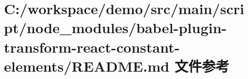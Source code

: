 \hypertarget{node__modules_2babel-plugin-transform-react-constant-elements_2_r_e_a_d_m_e_8md}{}\section{C\+:/workspace/demo/src/main/script/node\+\_\+modules/babel-\/plugin-\/transform-\/react-\/constant-\/elements/\+R\+E\+A\+D\+ME.md 文件参考}
\label{node__modules_2babel-plugin-transform-react-constant-elements_2_r_e_a_d_m_e_8md}

